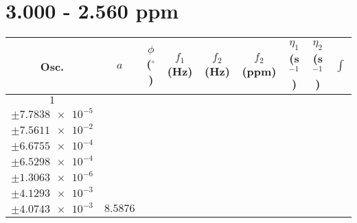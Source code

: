 \documentclass[8pt]{article}
\begin{document}
\section*{3.000 - 2.560 ppm}
\begin{longtable}[l]{c c c c c c c c c}
\toprule
Osc. & $a$ & $\phi$ ($^{\circ}$) & $f_1$ (Hz) & $f_2$ (Hz) & $f_2$ (ppm) & $\eta_1$ (s$^{-1}$) & $\eta_2$ (s$^{-1}$) & $\int$\\
\midrule
$\num{1}$ & \begin{tabular}[c]{@{}c@{}}$\num{5.9496e-2}$ \\ $\pm\num{7.7838e-5}$\end{tabular} & \begin{tabular}[c]{@{}c@{}}$\num{7.1039e-2}$ \\ $\pm\num{7.5611e-2}$\end{tabular} & \begin{tabular}[c]{@{}c@{}}$\num{-12.902}$ \\ $\pm\num{6.6755e-4}$\end{tabular} & \begin{tabular}[c]{@{}c@{}}$\num{1.3213e+3}$ \\ $\pm\num{6.5298e-4}$\end{tabular} & \begin{tabular}[c]{@{}c@{}}$\num{2.6433}$ \\ $\pm\num{1.3063e-6}$\end{tabular} & \begin{tabular}[c]{@{}c@{}}$\num{2.6923}$ \\ $\pm\num{4.1293e-3}$\end{tabular} & \begin{tabular}[c]{@{}c@{}}$\num{2.6283}$ \\ $\pm\num{4.0743e-3}$\end{tabular} & $\num{8.5876}$\\

\end{longtable}
\end{document}

